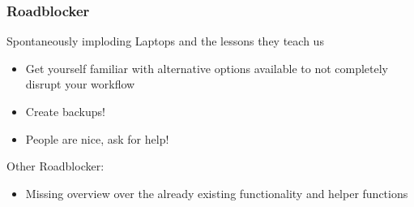 \begin{frame}
	\frametitle{Roadblocker}
	\Large
	Spontaneously imploding Laptops and the lessons they teach us
	\large
	\begin{itemize}
		\item Get yourself familiar with alternative options available to not completely disrupt your workflow
		\item Create backups!
		\item People are nice, ask for help!
	\end{itemize}

	\Large
	Other Roadblocker:
	\large
	\begin{itemize}
		\item<1->  Missing overview over the already existing functionality and helper functions
	\end{itemize}
	
\end{frame}




